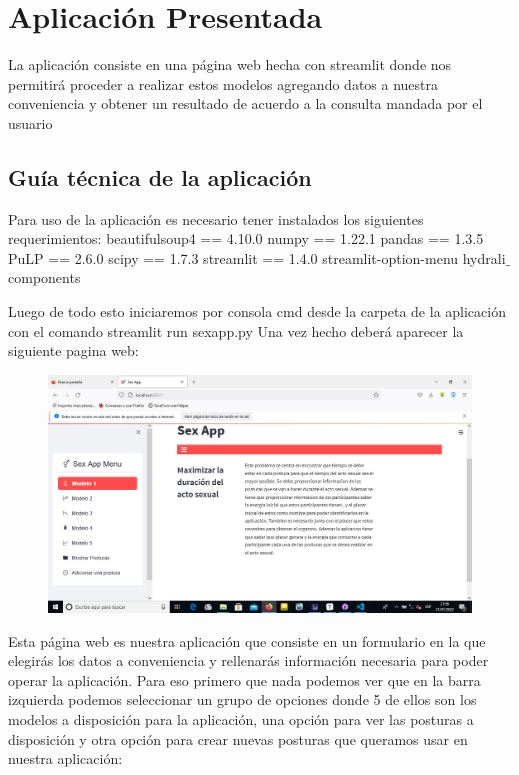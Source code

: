 \documentclass{llncs}
\begin{document}
\section{Aplicación Presentada}
La aplicación consiste en una página web hecha con streamlit donde nos permitirá proceder a realizar estos modelos agregando datos a nuestra conveniencia y obtener un resultado de acuerdo a la consulta mandada por el usuario 

\subsection{Guía técnica de la aplicación}
Para uso de la aplicación es necesario tener instalados los siguientes requerimientos:
\newline
\newline
beautifulsoup4 == 4.10.0
\newline
numpy == 1.22.1
\newline
pandas == 1.3.5
\newline
PuLP == 2.6.0
\newline
scipy == 1.7.3
\newline
streamlit == 1.4.0
\newline
\newline
streamlit-option-menu
\newline
\newline
hydrali$\_$components

Luego de todo esto iniciaremos por consola cmd desde la carpeta de la aplicación con el comando streamlit run sexapp.py
\newline
\newline
Una vez hecho deberá aparecer la siguiente pagina web:

\begin{figure}
	\centering
	\includegraphics[width=0.7\linewidth]{Imagenes/aplicacion/web1}
	\label{fig:web1}
\end{figure}

Esta página web es nuestra aplicación que consiste en un formulario en la que elegirás los datos a conveniencia y rellenarás información necesaria para poder operar la aplicación.
\newline
\newline
Para eso primero que nada podemos ver que en la barra izquierda podemos seleccionar un grupo de opciones donde 5 de ellos son los modelos a disposición para la aplicación, una opción para ver las posturas a disposición y otra opción para crear nuevas posturas que queramos usar en nuestra aplicación:
\end{document}
